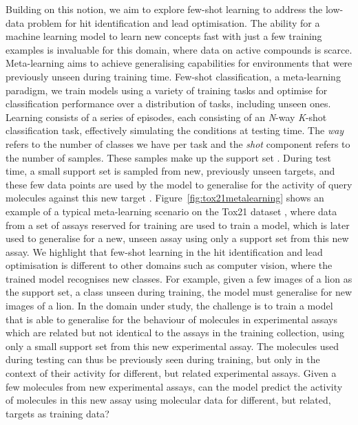 Building on this notion, we aim to explore few-shot learning to address the low-data problem for hit identification and lead optimisation. The ability for a machine learning model to learn new concepts fast with just a few training examples is invaluable for this domain, where data on active compounds is scarce. Meta-learning aims to achieve generalising capabilities for environments that were previously unseen during training time. Few-shot classification, a meta-learning paradigm, we train models using a variety of training tasks and optimise for classification performance over a distribution of tasks, including unseen ones. Learning consists of a series of episodes, each consisting of an \textit{N}-way \textit{K}-shot classification task, effectively simulating the conditions at testing time. The \textit{way} refers to the number of classes we have per task and the \textit{shot} component refers to the number of samples. These samples make up the support set \cite{snell2017prototypical}. During test time, a small support set is sampled from new, previously unseen targets, and these few data points are used by the model to generalise for the activity of query molecules against this new target \cite{vinyals2016matching}. Figure~\ref{fig:tox21metalearning} shows an example of a typical meta-learning scenario on the Tox21 dataset \citep{huang2016tox21challenge}, where data from a set of assays reserved for training are used to train a model, which is later used to generalise for a new, unseen assay using only a support set from this new assay. We highlight that few-shot learning in the hit identification and lead optimisation is different to other domains such as computer vision, where the trained model recognises new classes. For example, given a few images of a lion as the support set, a class unseen during training, the model must generalise for new images of a lion. In the domain under study, the challenge is to train a model that is able to generalise for the behaviour of molecules in experimental assays which are related but not identical to the assays in the training collection, using only a small support set from this new experimental assay. The molecules used during testing can thus be previously seen during training, but only in the context of their activity for different, but related experimental assays. Given a few molecules from new experimental assays, can the model predict the activity of molecules in this new assay using molecular data for different, but related, targets as training data?

